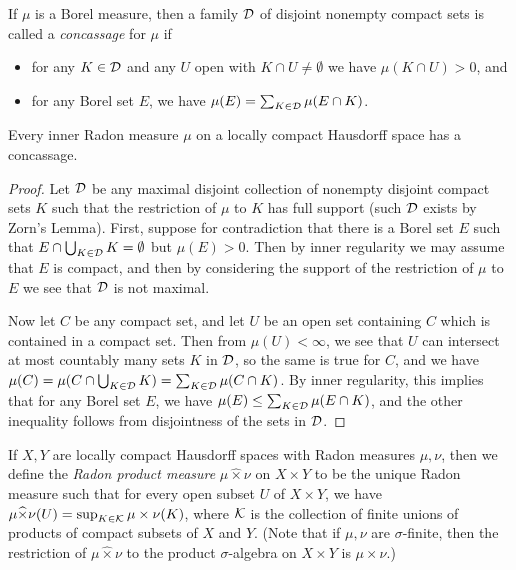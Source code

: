 \begin{defn} If $\mu$ is a Borel measure, then a family $\mathcal{D}$ of disjoint nonempty compact sets is called a \emph{concassage} for $\mu$ if
\begin{itemize}
\item for any $K \in \mathcal{D}$ and any $U$ open with $K \cap U \ne \emptyset$ we have $\mu(K \cap U) > 0$, and

\item for any Borel set $E$, we have $\mu(E) = \sum_{K \in \mathcal{D}} \mu(E \cap K)$.
\end{itemize}
\end{defn}

\begin{prop} Every inner Radon measure $\mu$ on a locally compact Hausdorff space has a concassage.
\end{prop}
\begin{proof} Let $\mathcal{D}$ be any maximal disjoint collection of nonempty disjoint compact sets $K$ such that the restriction of $\mu$ to $K$ has full support (such $\mathcal{D}$ exists by Zorn's Lemma). First, suppose for contradiction that there is a Borel set $E$ such that $E \cap \bigcup_{K \in \mathcal{D}} K = \emptyset$ but $\mu(E) > 0$. Then by inner regularity we may assume that $E$ is compact, and then by considering the support of the restriction of $\mu$ to $E$ we see that $\mathcal{D}$ is not maximal.

Now let $C$ be any compact set, and let $U$ be an open set containing $C$ which is contained in a compact set. Then from $\mu(U) < \infty$, we see that $U$ can intersect at most countably many sets $K$ in $\mathcal{D}$, so the same is true for $C$, and we have $\mu(C) = \mu(C \cap \bigcup_{K \in \mathcal{D}} K) = \sum_{K \in \mathcal{D}} \mu(C \cap K)$. By inner regularity, this implies that for any Borel set $E$, we have $\mu(E) \le \sum_{K \in \mathcal{D}} \mu(E \cap K)$, and the other inequality follows from disjointness of the sets in $\mathcal{D}$.
\end{proof}

\begin{defn} If $X,Y$ are locally compact Hausdorff spaces with Radon measures $\mu,\nu$, then we define the \emph{Radon product measure} $\mu\widehat{\times}\nu$ on $X\times Y$ to be the unique Radon measure such that for every open subset $U$ of $X\times Y$, we have $\mu\widehat{\times}\nu(U) = \sup_{K \in \mathcal{K}} \mu\times\nu(K)$, where $\mathcal{K}$ is the collection of finite unions of products of compact subsets of $X$ and $Y$. (Note that if $\mu, \nu$ are $\sigma$-finite, then the restriction of $\mu\widehat{\times}\nu$ to the product $\sigma$-algebra on $X\times Y$ is $\mu\times\nu$.)
\end{defn}

